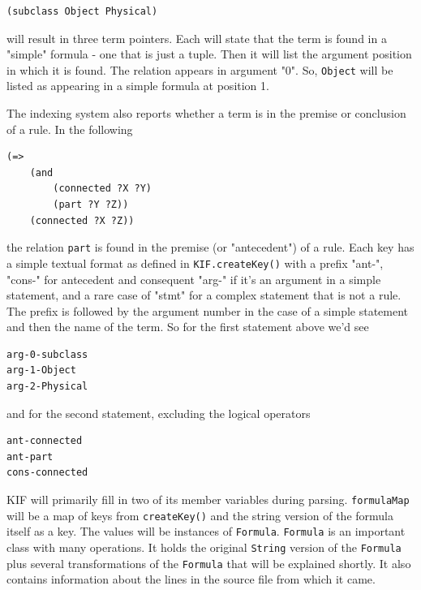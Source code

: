 \documentclass{book}
\begin{document}
\begin{lstlisting}[basicstyle=\ttfamily\small\bfseries]
(subclass Object Physical)
\end{lstlisting}

will result in three term pointers.  Each will state that the term is found
in a "simple" formula - one that is just a tuple.  Then it will list the argument
position in which it is found.  The relation appears in argument "0".  So,
\texttt{Object} will be listed as appearing in a simple formula at position 1.

The indexing system also reports whether a term is in the premise or conclusion of
a rule.  In the following

\begin{lstlisting}[basicstyle=\ttfamily\small\bfseries]
(=>
    (and
        (connected ?X ?Y)
        (part ?Y ?Z))
    (connected ?X ?Z))
\end{lstlisting}

the relation \texttt{part} is found in the premise (or "antecedent") of a rule. Each key
has a simple textual format as defined in \texttt{KIF.createKey()} with a prefix
"ant-", "cons-" for antecedent and consequent "arg-" if it's an argument in a simple
statement, and a rare case of "stmt" for a complex statement that is not a rule.
The prefix is followed by the argument number in the case of a simple statement and
then the name of the term.  So for the first statement above we'd see

\begin{lstlisting}[basicstyle=\ttfamily\small\bfseries]
arg-0-subclass
arg-1-Object
arg-2-Physical
\end{lstlisting}

and for the second statement, excluding the logical operators

\begin{lstlisting}[basicstyle=\ttfamily\small\bfseries]
ant-connected
ant-part
cons-connected
\end{lstlisting}

\begin{sloppypar}
KIF will primarily fill in two of its member variables during parsing.  \texttt{formulaMap}
will be a map of keys from \texttt{createKey()} and the string version of the formula itself
as a key.  The values will be instances of \texttt{Formula}.  \texttt{Formula} is an important
class with many operations.  It holds the original \texttt{String} version of the \texttt{Formula}
plus several transformations of the \texttt{Formula} that will be explained shortly.  It also
contains information about the lines in the source file from which it came.
\end{sloppypar}
\end{document}
